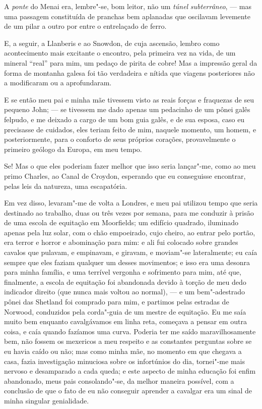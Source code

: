 A \textit{ponte} do Menai era, lembre"-se, bom leitor, não um \textit{túnel}
\textit{subterrâneo}, --- mas uma passagem constituída de pranchas bem
aplanadas que oscilavam levemente de um pilar a outro por entre o
entrelaçado de ferro.

E, a seguir, a Llanberis e ao Snowdon, de cuja ascensão, lembro
como acontecimento mais excitante o encontro, pela primeira vez na vida,
de um mineral ``real'' para mim, um pedaço de pirita de cobre! Mas a
impressão geral da forma de montanha galesa foi tão verdadeira e nítida
que viagens posteriores não a modificaram ou a aprofundaram.

E se então meu pai e minha mãe tivessem visto as reais forças e
fraquezas de seu pequeno John; --- se tivessem me dado apenas um
pedacinho de um pônei galês felpudo, e me deixado a cargo de um bom guia
galês, e de sua esposa, caso eu precisasse de cuidados, eles teriam
feito de mim, naquele momento, um homem, e posteriormente, para o
conforto de seus próprios corações, provavelmente o primeiro geólogo da
Europa, em meu tempo.

Se! Mas o que eles poderiam fazer melhor que isso seria lançar"-me, como
ao meu primo Charles, ao Canal de Croydon, esperando que eu conseguisse
encontrar, pelas leis da natureza, uma escapatória.

Em vez disso, levaram"-me de volta a Londres, e meu pai utilizou
tempo que seria destinado ao trabalho, duas ou três vezes por semana,
para me conduzir à prisão de uma escola de equitação em Moorfields; um
edifício quadrado, iluminado apenas pela luz solar, com o chão
empoeirado, cujo cheiro, ao entrar pelo portão, era terror e horror e
abominação para mim: e ali fui colocado sobre grandes cavalos que
pulavam, e empinavam, e giravam, e moviam"-se lateralmente; eu caía
sempre que eles faziam qualquer um desses movimentos; e isso era uma
desonra para minha família, e uma terrível vergonha e sofrimento para
mim, até que, finalmente, a escola de equitação foi abandonada devido à
torção de meu dedo indicador direito (que nunca mais voltou ao normal),
--- e um bem"-adestrado pônei das Shetland foi comprado para mim, e
partimos pelas estradas de Norwood, conduzidos pela corda"-guia de um
mestre de equitação. Eu me saía muito bem enquanto cavalgávamos em linha
reta, começava a pensar em outra coisa, e caía quando fazíamos uma
curva. Poderia ter me saído maravilhosamente bem, não fossem os
mexericos a meu respeito e as constantes perguntas sobre se eu havia
caído ou não; mas como minha mãe, no momento em que chegava a casa,
fazia investigação minuciosa sobre os infortúnios do dia, tornei"-me mais
nervoso e desamparado a cada queda; e este aspecto de minha educação foi
enfim abandonado, meus pais consolando"-se, da melhor maneira possível,
com a conclusão de que o fato de eu não conseguir aprender a cavalgar
era um sinal de minha singular genialidade.

